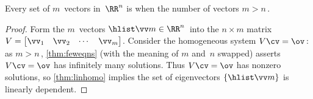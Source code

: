 \begin{theorem} \label{thm:mgtnli} 
Every  set of \(m\)~vectors in~\(\RR^n\) is  when the number of vectors \(m>n\)\,.
\end{theorem}
\begin{proof} 
Form the \(m\)~vectors \(\hlist\vv m\in\RR^n\)\ into the \(n\times m\) matrix \(V=\begin{bmatrix} \vv_1&\vv_2&\cdots&\vv_m \end{bmatrix}\).
Consider the homogeneous system \(V\cv=\ov\)\,: 
as \(m>n\)\,, \autoref{thm:feweqns} (with the meaning of \(m\) and~\(n\) swapped) asserts \(V\cv=\ov\) has infinitely many solutions.
Thus \(V\cv=\ov\) has nonzero solutions, so \autoref{thm:linhomo} implies the set of eigenvectors \(\{\hlist\vv m\}\) is linearly dependent.
\end{proof}



